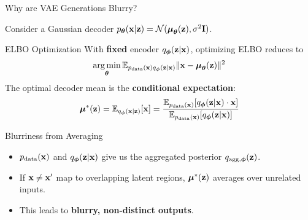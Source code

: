 \documentclass{beamer}
\renewcommand{\eqpause}{}
\begin{document}
\begin{frame}{Why are VAE Generations Blurry?}
	
	Consider a Gaussian decoder $p_{\boldsymbol{\theta}}(\mathbf{x} | \mathbf{z}) = \mathcal{N}(\boldsymbol{\mu}_{\boldsymbol{\theta}}(\mathbf{z}), \sigma^2 \mathbf{I})$.
	\eqpause
	\begin{block}{ELBO Optimization}
		With \textbf{fixed} encoder $q_{\boldsymbol{\phi}}(\mathbf{z} | \mathbf{x})$, optimizing ELBO reduces to
		\vspace{-0.3cm}
		\[
			\operatorname*{arg\,min}_{\boldsymbol{\theta}} \mathbb{E}_{p_{\text{data}}(\mathbf{x}) q_{\boldsymbol{\phi}}(\mathbf{z} | \mathbf{x})} \| \mathbf{x} - \boldsymbol{\mu}_{\boldsymbol{\theta}}(\mathbf{z}) \|^2
		\]
		The optimal decoder mean is the \textbf{conditional expectation}:
		\vspace{-0.3cm}
		\[
			\boldsymbol{\mu}^*(\mathbf{z}) = \mathbb{E}_{q_{\boldsymbol{\phi}}(\mathbf{x} | \mathbf{z})}[\mathbf{x}] = \frac{\mathbb{E}_{p_{\text{data}}(\mathbf{x})}[q_{\boldsymbol{\phi}}(\mathbf{z} | \mathbf{x}) \cdot \mathbf{x}]}{\mathbb{E}_{p_{\text{data}}(\mathbf{x})}[q_{\boldsymbol{\phi}}(\mathbf{z} | \mathbf{x})]}
		\]
		\vspace{-0.7cm}
	\end{block}
	\eqpause
	\begin{block}{Blurriness from Averaging}
		\begin{itemize}
			\item $p_{\text{data}}(\mathbf{x})$ and $q_{\boldsymbol{\phi}}(\mathbf{z} | \mathbf{x})$ give us the aggregated posterior $q_{\text{agg}, \boldsymbol{\phi}}(\mathbf{z})$.
			\item If $\mathbf{x} \neq \mathbf{x}'$ map to overlapping latent regions, $\boldsymbol{\mu}^*(\mathbf{z})$ averages over unrelated inputs.
			\item This leads to \textbf{blurry, non-distinct outputs}.
		\end{itemize}
	\end{block}
\end{frame}
\end{document}
